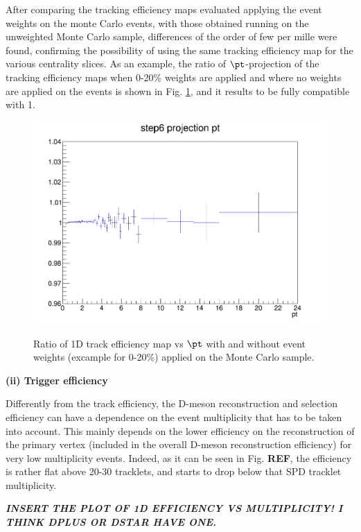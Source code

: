 After comparing the tracking efficiency maps evaluated applying the event weights on the monte Carlo events, with those obtained running on the unweighted Monte Carlo sample, differences of the order of few per mille were found, confirming the possibility of using the same tracking efficiency map for the various centrality slices.
As an example, the ratio of $\pt$-projection of the tracking efficiency maps when 0-20\% weights are applied and where no weights are applied on the events is shown in Fig. \ref{fig:TrackEFfWeights}, and it results to be fully compatible with 1.

\begin{figure}
\centering
{\includegraphics[width=0.7\linewidth]{figuresVsCent/Global/CrossCheck_TrackEffWeight.png}}
 \caption{Ratio of 1D track efficiency map vs $\pt$ with and without event weights (excample for 0-20\%) applied on the Monte Carlo sample.}
\label{fig:TrackEFfWeights}
\end{figure}

{\bf (ii) Trigger efficiency}

Differently from the track efficiency, the D-meson reconstruction and selection efficiency can have a dependence on the event multiplicity that has to be taken into account. This mainly depends on the lower efficiency on the reconstruction of the primary vertex (included in the overall D-meson reconstruction efficiency) for very low multiplicity events. Indeed, as it can be seen in Fig. {\bf REF}, the efficiency is rather flat above 20-30 tracklets, and starts to drop below that SPD tracklet multiplicity.

\textit{\textbf{INSERT THE PLOT OF 1D EFFICIENCY VS MULTIPLICITY! I THINK DPLUS OR DSTAR HAVE ONE.}}


